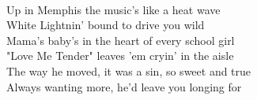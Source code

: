 \\
Up in Memphis the music's like a heat wave \\
	White Lightnin' bound to drive you wild \\
	Mama's baby's in the heart of every school girl \\
	"Love Me Tender" leaves 'em cryin' in the aisle \\
	The way he moved, it was a sin, so sweet and true \\
	Always wanting more, he'd leave you longing for \\

